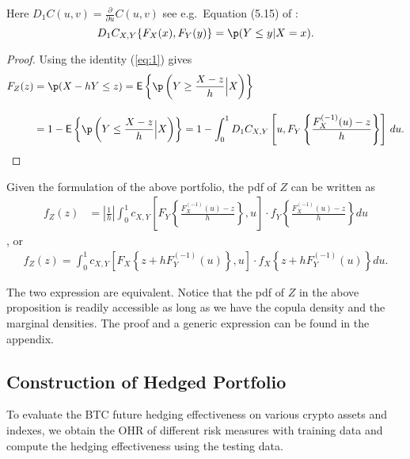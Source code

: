 Here $D_1 C(u,v)=\displaystyle \frac{\partial}{\partial u} C(u,v)$ see e.g.\ Equation (5.15) of
\citep{McNeil2005}:
\begin{equation}
  \label{eq:1}
  D_1 C_{X,Y}\{F_X(x), F_Y(y)\} = \p(Y\leq y|X=x).
\end{equation}
\begin{proof}
  Using the identity (\ref{eq:1}) gives
  \begin{align*}
    F_{Z}(z) &= \p(X - h Y\leq z) %
                 = \mbox{\sf E}\left\{\p\left(Y\geq \frac{X-z}{h}\Big|
                 X\right)\right\}\\[10pt]
               &= 1-\mbox{\sf E}\left\{\p\left(Y\leq \frac{X-z}{h}\Big|
                 X\right)\right\}%
               = 1- \int_0^1 D_1 C_{X, Y}\left[u,
                 F_{Y}\left\{\frac{F^{(-1)}_{X}(u) -
                 z}{h}\right\}\right]\, d u.
  \end{align*}
  \end{proof}


\begin{corollary} Given the formulation of the above portfolio, the pdf of $Z$ can be written as
  \begin{align}
  f_{Z}(z) &= \left|\frac{1}{h}\right|\int_0^1 c_{X, Y} \left[
  F_{Y}\left\{\frac{F^{(-1)}_{X}(u)-z}{h}\right\}, u
  \right]
   \cdot
  f_{Y}
  \left\{\frac{F^{(-1)}_{X}(u)-z}{h}\right\} du \label{eq:density1}
  \end{align}, or
    \begin{align}
      f_{Z}(z)
      = \int_0^1 c_{X, Y} \left[
      F_{X}\left\{z + h F^{(-1)}_{Y}(u)\right\}, u
      \right]
       \cdot
      f_{X}
      \left\{
      z+ hF^{(-1)}_{Y}(u)
      \right\} du. \label{eq:density2}
  \end{align}
  \end{corollary}
The two expression are equivalent.
Notice that the pdf of $Z$ in the above proposition is readily accessible as long as we have
the copula density and the marginal densities.
The proof and a generic expression can be found in the
appendix. \medskip



\subsection{Construction of Hedged Portfolio}
To evaluate the BTC future hedging effectiveness on various crypto assets and indexes,
we obtain the OHR of different risk measures with training data and compute the hedging effectiveness using the testing data. \medskip

